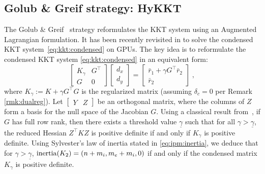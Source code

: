 \subsection{Golub \& Greif strategy: HyKKT}
\label{sec:kkt:golubgreif}
The Golub \& Greif~\cite{golub2003solving} strategy reformulates the KKT
system using an Augmented Lagrangian formulation.
It has been recently revisited in \cite{regev2023hykkt} to solve the
condensed KKT system~\eqref{eq:kkt:condensed} on GPUs.
The key idea is to reformulate the condensed KKT system \eqref{eq:kkt:condensed} in an equivalent form:
\begin{equation}
  \label{eq:kkt:hykkt}
  \begin{bmatrix}
    K_\gamma & G^\top \\
    G & 0
  \end{bmatrix}
  \begin{bmatrix}
    d_x \\ d_y
  \end{bmatrix}
  =
  \begin{bmatrix}
    \bar{r}_1 + \gamma G^\top \bar{r}_2 \\
    \bar{r}_2
  \end{bmatrix} \; ,
\end{equation}
where $K_\gamma := K + \gamma G^\top G$ is the regularized matrix (assuming $\delta_c=0$ per Remark \ref{rmk:dualreg}).
Let $\begin{bmatrix} Y & Z \end{bmatrix}$ be an orthogonal
matrix, where the columns of $Z$ form a basis for the null space of the Jacobian $G$.
Using a classical result from~\cite{debreu1952definite}, if $G$ has full row
rank, then there exists a threshold value $\underline{\gamma}$ such that for
all $\gamma > \underline{\gamma}$, the reduced Hessian $Z^\top K Z$ is
positive definite if and only if $K_\gamma$ is positive definite.
Using Sylvester's law of inertia stated in \eqref{eq:ipm:inertia}, we deduce that for $\gamma > \underline{\gamma}$, $\operatorname{inertia}(K_2) = (n + m_i, m_e + m_i, 0)$ if and only if the condensed matrix $K_\gamma$ is positive definite.

